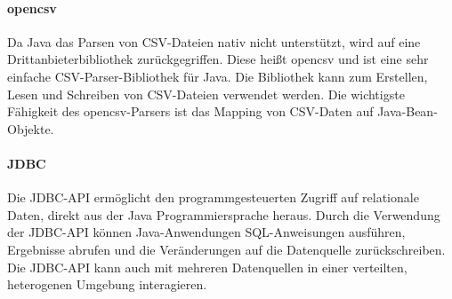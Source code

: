 \paragraph{opencsv}

Da Java das Parsen von CSV-Dateien nativ nicht unterstützt, wird auf eine Drittanbieterbibliothek zurückgegriffen. Diese heißt opencsv und ist eine sehr einfache CSV-Parser-Bibliothek für Java. Die Bibliothek kann zum Erstellen, Lesen und Schreiben von CSV-Dateien verwendet werden. Die wichtigste Fähigkeit des opencsv-Parsers ist das Mapping von CSV-Daten auf Java-Bean-Objekte.

\paragraph{JDBC}

Die JDBC-API ermöglicht den programmgesteuerten Zugriff auf relationale Daten, direkt aus der Java Programmiersprache heraus. Durch die Verwendung der JDBC-API können Java-Anwendungen SQL-Anweisungen ausführen, Ergebnisse abrufen und die Veränderungen auf die Datenquelle zurückschreiben. Die JDBC-API kann auch mit mehreren Datenquellen in einer verteilten, heterogenen Umgebung interagieren. 

